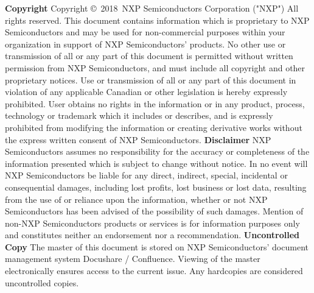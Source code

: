\documentclass[oneside]{book}
\newcommand{\copyrightYear}{2018}        %
\newcommand{\+}{\discretionary{\mbox{\scriptsize$\hookleftarrow$}}{}{}}
\begin{document}
\footnotesize
{ \setlength{\parindent}{0pt} \textbf{Copyright} }
\newline \newline
\vspace{4pt}
Copyright \copyright \ \copyrightYear \ NXP Semiconductors Corporation ("NXP") All rights reserved.
\newline
\scriptsize
This document contains information which is proprietary to NXP Semiconductors and may be used for non-commercial purposes within your organization in support of NXP Semiconductors'  products.
No other use or transmission of all or any part of this document is permitted without written permission from NXP Semiconductors, and must include all copyright and other proprietary notices.
Use or transmission of all or any part of this document in violation of any applicable Canadian or other legislation is hereby expressly prohibited.
\vspace{4pt}
\newline
User obtains no rights in the information or in any product, process, technology or trademark which it includes or describes, and is expressly prohibited from modifying the information or creating derivative works without the express written consent of NXP Semiconductors.
\newline \newline \newline
{\footnotesize \textbf{Disclaimer}}
\vspace{5pt}
\newline
NXP Semiconductors assumes no responsibility for the accuracy or completeness of the information presented which is subject to change without notice.
In no event will NXP Semiconductors be liable for any direct, indirect, special, incidental or consequential damages, including lost profits, lost business or lost data, resulting from the use of or reliance upon the information, whether or not NXP Semiconductors has been advised of the possibility of such damages.
\vspace{3pt}
\newline
Mention of non-NXP Semiconductors products or services is for information purposes only and constitutes neither an endorsement nor a recommendation.
\newline \newline \newline
{\footnotesize \textbf{Uncontrolled Copy}}
\vspace{5pt}
\newline
The master of this document is stored on NXP Semiconductors' document management system Docushare / Confluence.  Viewing of the master electronically ensures access to the current issue. Any hardcopies are considered uncontrolled copies.
\newpage
\normalsize
\end{document}
